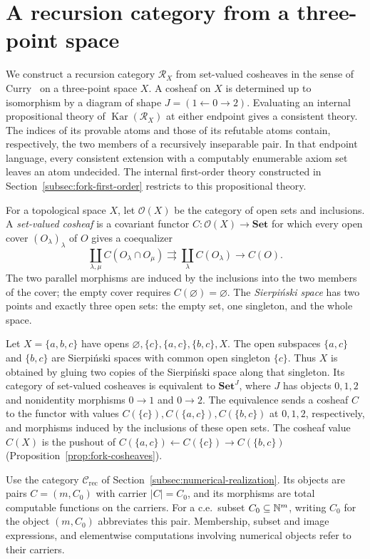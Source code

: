 \section{A recursion category from a three-point space}\label{sec:cosheaves}

We construct a recursion category $\mathscr R_X$ from set-valued
cosheaves in the sense of Curry~\cite[Definition~2.6]{CurryCosheaves}
on a three-point space $X$. A cosheaf on $X$ is determined up to isomorphism
by a diagram of shape $J=(1\leftarrow 0\to 2)$. Evaluating an internal propositional theory
of $\operatorname{Kar}(\mathscr R_X)$ at either endpoint gives a consistent theory.
The indices of its provable atoms and those of its refutable atoms
contain, respectively, the two members of a recursively inseparable pair.
In that endpoint language, every consistent extension with a computably
enumerable axiom set leaves an atom undecided. The internal first-order theory constructed
in Section~\ref{subsec:fork-first-order} restricts to this propositional
theory.

For a topological space $X$, let $\mathcal O(X)$ be the category
of open sets and inclusions. A \emph{set-valued cosheaf} is a
covariant functor $C:\mathcal O(X)\to\mathbf{Set}$ for which
every open cover $(O_\lambda)_\lambda$ of $O$ gives a coequalizer
\[
 \coprod_{\lambda,\mu} C(O_\lambda\cap O_\mu)
 \rightrightarrows \coprod_\lambda C(O_\lambda)
 \longrightarrow C(O).
\]
The two parallel morphisms are induced by the inclusions into the two
members of the cover; the empty cover requires
$C(\varnothing)=\varnothing$.
The \emph{Sierpi\'nski space} has two points and exactly three open
sets: the empty set, one singleton, and the whole space.

Let $X=\{a,b,c\}$ have opens
$\varnothing,\{c\},\{a,c\},\{b,c\},X$.
The open subspaces $\{a,c\}$ and $\{b,c\}$ are Sierpi\'nski spaces
with common open singleton $\{c\}$. Thus $X$ is obtained by gluing
two copies of the Sierpi\'nski space along that singleton.
Its category of set-valued cosheaves is equivalent to
$\mathbf{Set}^{J}$, where $J$ has objects $0,1,2$ and nonidentity
morphisms $0\to1$ and $0\to2$.
The equivalence sends a cosheaf $C$ to the functor with values
$C(\{c\}),C(\{a,c\}),C(\{b,c\})$ at $0,1,2$, respectively,
and morphisms induced by the inclusions of these open sets.
The cosheaf value $C(X)$ is the pushout of
$C(\{a,c\})\leftarrow C(\{c\})\to C(\{b,c\})$
(Proposition~\ref{prop:fork-cosheaves}).

Use the category $\mathcal C_{\mathrm{rec}}$ of
Section~\ref{subsec:numerical-realization}. Its objects are pairs
$C=(m,C_0)$ with carrier $|C|=C_0$, and its morphisms are total
computable functions on the carriers. For a c.e.\ subset
$C_0\subseteq\mathbb N^m$, writing $C_0$ for the object $(m,C_0)$
abbreviates this pair. Membership, subset and image expressions,
and elementwise computations involving numerical objects refer
to their carriers.

